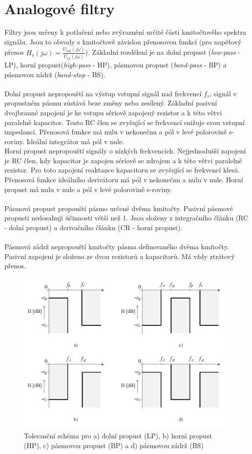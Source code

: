 \documentclass[twoside]{article}
\begin{document}
\section{Analogové filtry}
Filtry jsou určeny k potlačení nebo zvýraznění určité části kmitočtového spektra signálu. Jsou to obvody s kmitočtově závislou přenosovou funkcí (pro napěťový přenos $H_s(j \omega) = \frac{U_{out}(j \omega)}{U_{in}(j \omega)}$). Základní rozdělení je na dolní propust (\textit{low-pass} - LP), horní propust(\textit{high-pass} - HP), pásmovou propust (\textit{band-pass} - BP) a pásmovou zádrž (\textit{band-stop} - BS). \\
\\
Dolní propust nepropouští na výstup vstupní signál nad frekvencí $f_s$, signál v propustném pásmu zůstává beze změny nebo zesílený. Základní pasivní dvojbranné zapojení je ke vstupu sériově zapojený rezistor a k této větvi paralelně kapacitor. Tento RC člen se zvyšující se frekvencí snižuje svou vstupní impedanci. Přenosová funkce má nulu v nekonečnu a pól v levé polorovině s-roviny. Ideální integrátor má pól v nule. \\
Horní propust nepropouští signály o nízkých frekvencích. Nejjednodušší zapojení je RC člen, kdy kapacitor je zapojen sériově se zdrojem a k této větvi paralelně rezistor. Pro toto zapojení reaktance kapacitoru se zvyšující se frekvencí klesá. Přenosová funkce ideálního derivátoru má pól v nekonečnu a nulu v nule. Horní propust má nulu v nule a pól v levé polorovině s-roviny.\\
\\
Pásmová propust propouští pásmo určené dvěma kmitočty. Pasivní pásmové propusti nedosahují účinnosti větší než 1. Jsou složeny z integračního článku (RC - dolní propust) a derivačního článku (CR - horní propust).\\
\\
Pásmová zádrž nepropouští kmitočty pásma definovaného dvěma kmitočty. Pasivní zapojení je složeno ze dvou rezistorů a kapacitorů. Má vždy ztrátový přenos.
\begin{figure}[H]
\centering
\includegraphics[scale=0.55]{tolerancnischemata.png}
\caption{Toleranční schéma pro a) dolní propust (LP), b) horní propust (HP), c) pásmovou propust (BP) a d) pásmovou zádrž (BS)\cite{1}}
\end{figure}
\end{document}
